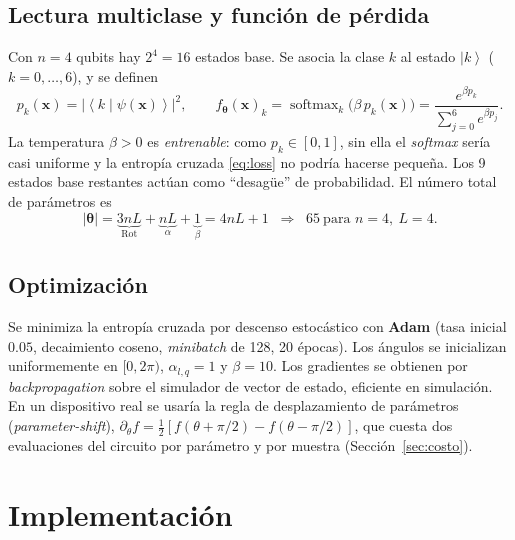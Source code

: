 \documentclass[11pt,letterpaper]{article}
\providecommand{\ket}[1]{\left|#1\right\rangle}
\providecommand{\braket}[2]{\left\langle#1\middle|#2\right\rangle}
\DeclareMathOperator{\softmax}{softmax}
\begin{document}
\subsection{Lectura multiclase y función de pérdida}
Con $n=4$ qubits hay $2^4=16$ estados base. Se asocia la clase $k$ al estado $\ket{k}$
($k=0,\dots,6$), y se definen
\begin{equation}
p_k(\bm{x})=\big|\braket{k}{\psi(\bm{x})}\big|^{2},\qquad
f_{\bm\theta}(\bm{x})_k=\softmax_k\big(\beta\,p_k(\bm{x})\big)
=\frac{e^{\beta p_k}}{\sum_{j=0}^{6}e^{\beta p_j}} .
\end{equation}
La temperatura $\beta>0$ es \emph{entrenable}: como $p_k\in[0,1]$, sin ella el \emph{softmax} sería casi
uniforme y la entropía cruzada \eqref{eq:loss} no podría hacerse pequeña. Los 9 estados base
restantes actúan como ``desagüe'' de probabilidad. El número total de parámetros es
\begin{equation}
|\bm\theta|=\underbrace{3nL}_{\mathrm{Rot}}+\underbrace{nL}_{\alpha}+\underbrace{1}_{\beta}=4nL+1
\;\;\Rightarrow\;\; 65\ \text{para } n=4,\ L=4 .
\end{equation}

\subsection{Optimización}
Se minimiza la entropía cruzada por descenso estocástico con \textbf{Adam} (tasa inicial
$0.05$, decaimiento coseno, \emph{minibatch} de 128, 20 épocas). Los ángulos se inicializan
uniformemente en $[0,2\pi)$, $\alpha_{l,q}=1$ y $\beta=10$. Los gradientes se obtienen por
\emph{backpropagation} sobre el simulador de vector de estado, eficiente en simulación. En un
dispositivo real se usaría la regla de desplazamiento de parámetros (\emph{parameter-shift}),
$\partial_\theta f=\tfrac12[f(\theta+\pi/2)-f(\theta-\pi/2)]$, que cuesta dos evaluaciones del circuito
por parámetro y por muestra (Sección~\ref{sec:costo}).

\section{Implementación}
\end{document}
